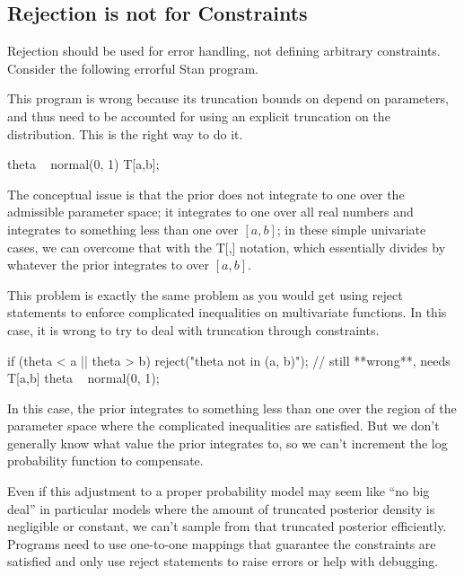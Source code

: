 \subsection{Rejection is not for Constraints}

Rejection should be used for error handling, not defining arbitrary
constraints.  Consider the following errorful Stan program.
%
\begin{stancode}
parameters {
  real a;
  real<lower=a> b;
  real<lower=a, upper=b> theta;
  ...
model {
  // **wrong** needs explicit truncation
  theta ~ normal(0, 1); 
  ...
\end{stancode}
%
This program is wrong because its truncation bounds on 
depend on parameters, and thus need to be accounted for using an
explicit truncation on the distribution.  This is the right way to do
it.  
%
\begin{stancode}
  theta ~ normal(0, 1) T[a,b];
\end{stancode}
%
The conceptual issue is that the prior does not integrate to one over
the admissible parameter space; it integrates to one over all real
numbers and integrates to something less than one over $[a,b]$; in these
simple univariate cases, we can overcome that with the T[,] notation,
which essentially divides by whatever the prior integrates to over
$[a,b]$.  

This problem is exactly the same problem as you would get using reject
statements to enforce complicated inequalities on multivariate
functions.  In this case, it is wrong to try to deal with truncation
through constraints.
%
\begin{stancode}
  if (theta < a || theta > b)
    reject("theta not in (a, b)");
  // still **wrong**, needs T[a,b]
  theta ~ normal(0, 1);
\end{stancode} 
%
In this case, the prior integrates to something less than one over the
region of the parameter space where the complicated inequalities are
satisfied. But we don't generally know what value the prior integrates
to, so we can't increment the log probability function to compensate.

Even if this adjustment to a proper probability model may seem like
``no big deal'' in particular models where the amount of truncated
posterior density is negligible or constant, we can't sample from that
truncated posterior efficiently.  Programs need to use one-to-one
mappings that guarantee the constraints are satisfied and only use
reject statements to raise errors or help with debugging.


